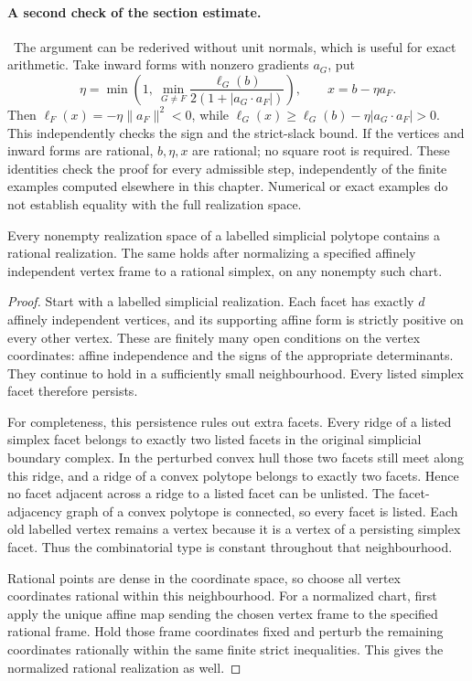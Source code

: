 \paragraph{A second check of the section estimate.}\ours\
The argument can be rederived without unit normals, which is useful for
exact arithmetic. Take inward forms with nonzero gradients \(a_G\), put
\[
 \eta=\min\left(1,\ \min_{G\ne F}
          \frac{\ell_G(b)}{2(1+|a_G\cdot a_F|)}\right),
 \qquad x=b-\eta a_F.
\]
Then \(\ell_F(x)=-\eta\|a_F\|^2<0\), while
\(\ell_G(x)\geq\ell_G(b)-\eta|a_G\cdot a_F|>0\).
This independently checks the sign and the strict-slack bound. If the
vertices and inward forms are rational, \(b,\eta,x\) are rational; no
square root is required. These identities check the proof for every
admissible step, independently of the finite examples computed elsewhere
in this chapter. Numerical or exact examples do not establish equality
with the full realization space.

\begin{proposition}[Rational points in simplicial realization spaces \ours]
Every nonempty realization space of a labelled simplicial polytope
contains a rational realization. The same holds after normalizing a
specified affinely independent vertex frame to a rational simplex, on
any nonempty such chart.
\end{proposition}
\begin{proof}
Start with a labelled simplicial realization. Each facet has exactly
\(d\) affinely independent vertices, and its supporting affine form is
strictly positive on every other vertex. These are finitely many open
conditions on the vertex coordinates: affine independence and the signs
of the appropriate determinants. They continue to hold in a sufficiently
small neighbourhood. Every listed simplex facet therefore persists.

For completeness, this persistence rules out extra facets. Every ridge
of a listed simplex facet belongs to exactly two listed facets in the
original simplicial boundary complex. In the perturbed convex hull those
two facets still meet along this ridge, and a ridge of a convex polytope
belongs to exactly two facets. Hence no facet adjacent across a ridge to
a listed facet can be unlisted. The facet-adjacency graph of a convex
polytope is connected, so every facet is listed. Each old labelled vertex
remains a vertex because it is a vertex of a persisting simplex facet.
Thus the combinatorial type is constant throughout that neighbourhood.

Rational points are dense in the coordinate space, so choose all vertex
coordinates rational within this neighbourhood. For a normalized chart,
first apply the unique affine map sending the chosen vertex frame to the
specified rational frame. Hold those frame coordinates fixed and perturb
the remaining coordinates rationally within the same finite strict
inequalities. This gives the normalized rational realization as well.
\end{proof}

